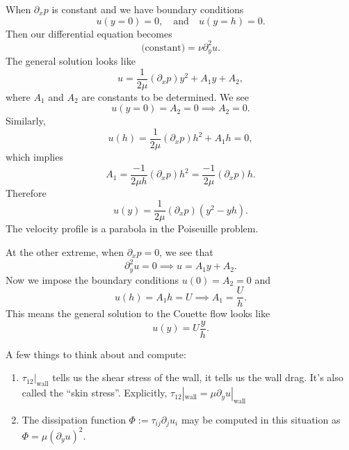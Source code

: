 \begin{node}
When $\partial_{x}p$ is constant and we have boundary conditions
\begin{equation}
u(y=0)=0,\quad\mbox{and}\quad u(y=h)=0.
\end{equation}
Then our differential equation becomes
\begin{equation}
\mbox{(constant)}=\nu\partial_{y}^{2}u.
\end{equation}
The general solution looks like
\begin{equation}
u = \frac{1}{2\mu}(\partial_{x}p)y^{2}+A_{1}y+A_{2},
\end{equation}
where $A_{1}$ and $A_{2}$ are constants to be determined. We see
\begin{equation}
u(y=0)=A_{2}=0\implies A_{2}=0.
\end{equation}
Similarly,
\begin{equation}
u(h)=\frac{1}{2\mu}(\partial_{x}p)h^{2}+A_{1}h=0,
\end{equation}
which implies
\begin{equation}
A_{1}=\frac{-1}{2\mu h}(\partial_{x}p)h^{2}=\frac{-1}{2\mu}(\partial_{x}p)h.
\end{equation}
Therefore
\begin{equation}
u(y) = \frac{1}{2\mu}(\partial_{x}p)(y^{2}-yh).
\end{equation}
The velocity profile is a parabola in the Poiseuille problem.
\end{node}

\begin{node}
At the other extreme, when $\partial_{x}p=0$, we see that
\begin{equation}
\partial_{y}^{2}u=0\implies u=A_{1}y+A_{2}.
\end{equation}
Now we impose the boundary conditions $u(0)=A_{2}=0$ and
\begin{equation}
u(h)=A_{1}h=U\implies A_{1}=\frac{U}{h}.
\end{equation}
This means the general solution to the Couette flow looks like
\begin{equation}
u(y)=U\frac{y}{h}.
\end{equation}
\end{node}

\begin{remark}
A few things to think about and compute:
\begin{enumerate}
\item $\tau_{12}|_{\text{wall}}$ tells us the shear stress of the
  wall, it tells us the wall drag. It's also called the ``skin stress''.
  Explicitly, $\tau_{12}|_{\text{wall}}=\mu\partial_{y}u|_{\text{wall}}$
\item The dissipation function $\Phi:=\tau_{ij}\partial_{j}u_{i}$ may
  be computed in this situation as $\Phi=\mu(\partial_{y}u)^{2}$. 
\end{enumerate}
\end{remark}

